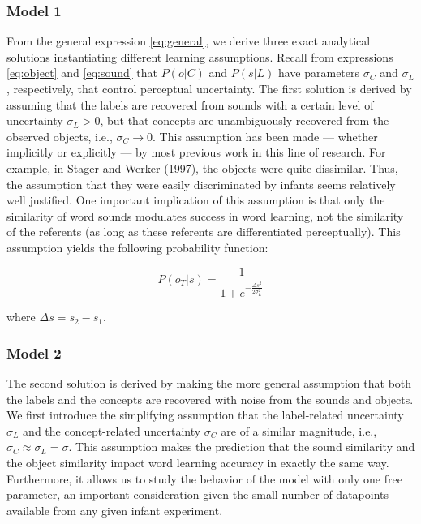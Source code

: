 \documentclass[english,,man]{apa6}
\theoremstyle{definition}
\theoremstyle{definition}
\theoremstyle{definition}
\theoremstyle{remark}
\begin{document}
\subsubsection{Model 1}\label{model-1}

From the general expression \ref{eq:general}, we derive three exact
analytical solutions instantiating different learning assumptions.
Recall from expressions \ref{eq:object} and \ref{eq:sound} that
\(P(o|C)\) and \(P(s|L)\) have parameters \(\sigma_C\) and \(\sigma_L\),
respectively, that control perceptual uncertainty. The first solution is
derived by assuming that the labels are recovered from sounds with a
certain level of uncertainty \(\sigma_L > 0\), but that concepts are
unambiguously recovered from the observed objects, i.e.,
\(\sigma_C \rightarrow 0\). This assumption has been made --- whether
implicitly or explicitly --- by most previous work in this line of
research. For example, in Stager and Werker (1997), the objects were
quite dissimilar. Thus, the assumption that they were easily
discriminated by infants seems relatively well justified. One important
implication of this assumption is that only the similarity of word
sounds modulates success in word learning, not the similarity of the
referents (as long as these referents are differentiated perceptually).
This assumption yields the following probability function:

\begin{equation} \label{eq:model1}
P(o_T|s)= \frac{1}{1 + e^{-\frac{\Delta s^2}{2\sigma_L^2}}}
\end{equation}

where \(\Delta s = s_2-s_1\).

\subsubsection{Model 2}\label{model-2}

The second solution is derived by making the more general assumption
that both the labels and the concepts are recovered with noise from the
sounds and objects. We first introduce the simplifying assumption that
the label-related uncertainty \(\sigma_L\) and the concept-related
uncertainty \(\sigma_C\) are of a similar magnitude, i.e.,
\(\sigma_C \approx \sigma_L = \sigma\). This assumption makes the
prediction that the sound similarity and the object similarity impact
word learning accuracy in exactly the same way. Furthermore, it allows
us to study the behavior of the model with only one free parameter, an
important consideration given the small number of datapoints available
from any given infant experiment.
\end{document}
